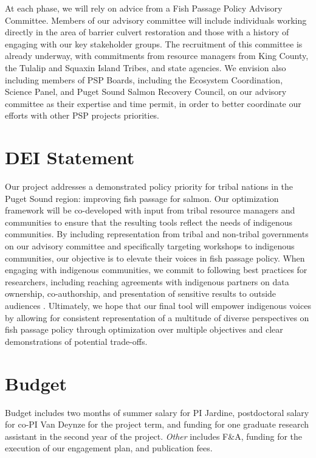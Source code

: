 \documentclass[12pt]{elsarticle}
\begin{document}
	At each phase, we will rely on advice from a Fish Passage Policy Advisory Committee. Members of our advisory committee will include individuals working directly in the area of barrier culvert restoration and those with a history of engaging with our key stakeholder groups. The recruitment of this committee is already underway, with commitments from resource managers from King County, the Tulalip and Squaxin Island Tribes, and state agencies. We envision also including members of PSP Boards, including the Ecosystem Coordination, Science Panel, and Puget Sound Salmon Recovery Council, on our advisory committee as their expertise and time permit, in order to better coordinate our efforts with other PSP projects priorities. 
	
	\section{DEI Statement}
	Our project addresses a demonstrated policy priority for tribal nations in the Puget Sound region: improving fish passage for salmon. Our optimization framework will be co-developed with input from tribal resource managers and communities to ensure that the resulting tools reflect the needs of indigenous communities. By including representation from tribal and non-tribal governments on our advisory committee and specifically targeting workshops to indigenous communities, our objective is to elevate their voices in fish passage policy. When engaging with indigenous communities, we commit to following best practices for researchers, including reaching agreements with indigenous partners on data ownership, co-authorship, and presentation of sensitive results to outside audiences \cite{ban_incorporate_2018}. Ultimately, we hope that our final tool will empower indigenous voices by allowing for consistent representation of a multitude of diverse perspectives on fish passage policy through optimization over multiple objectives and clear demonstrations of potential trade-offs.
	
	\section{Budget}
	Budget includes two months of summer salary for PI Jardine, postdoctoral salary for co-PI Van Deynze for the project term, and funding for one graduate research assistant in the second year of the project. \textit{Other} includes F\&A,  funding for the execution of our engagement plan, and publication fees.
	
\end{document}
